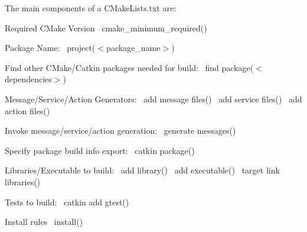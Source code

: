 The main components of a C\+Make\+Lists.\+txt are\+:~\newline
\begin{DoxyItemize}
\item Required C\+Make Version~\newline
 {\ttfamily cmake\+\_\+minimum\+\_\+required()} \item Package Name\+:~\newline
 {\ttfamily project($<$package\+\_\+name$>$)} \item Find other C\+Make/\+Catkin packages needed for build\+:~\newline
 {\ttfamily find package($<$dependencies$>$)} \item Message/\+Service/\+Action Generators\+:~\newline
 {\ttfamily add message files()~\newline
 add service files()~\newline
 add action files()} \item Invoke message/service/action generation\+:~\newline
 {\ttfamily generate messages()} \item Specify package build info export\+:~\newline
 {\ttfamily catkin package()} \item Libraries/\+Executable to build\+:~\newline
 {\ttfamily add library()~\newline
 add executable()~\newline
 target link libraries()} \item Tests to build\+:~\newline
 {\ttfamily catkin add gtest()} \item Install rules~\newline
 {\ttfamily install()} \end{DoxyItemize}
